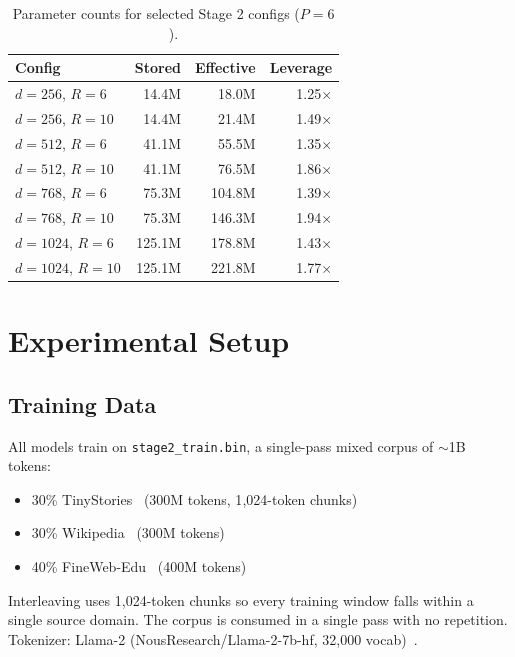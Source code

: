 \documentclass{article}
\begin{document}
\begin{table}[htbp]
\centering
\caption{Parameter counts for selected Stage 2 configs ($P=6$).}
\label{tab:params}
\footnotesize
\begin{tabular}{lrrr}
\toprule
Config & Stored & Effective & Leverage \\
\midrule
$d=256$, $R=6$ & 14.4M & 18.0M & 1.25$\times$ \\
$d=256$, $R=10$ & 14.4M & 21.4M & 1.49$\times$ \\
$d=512$, $R=6$ & 41.1M & 55.5M & 1.35$\times$ \\
$d=512$, $R=10$ & 41.1M & 76.5M & 1.86$\times$ \\
$d=768$, $R=6$ & 75.3M & 104.8M & 1.39$\times$ \\
$d=768$, $R=10$ & 75.3M & 146.3M & 1.94$\times$ \\
$d=1024$, $R=6$ & 125.1M & 178.8M & 1.43$\times$ \\
$d=1024$, $R=10$ & 125.1M & 221.8M & 1.77$\times$ \\
\bottomrule
\end{tabular}
\end{table}

\section{Experimental Setup}
\label{sec:setup}

\subsection{Training Data}

All models train on \texttt{stage2\_train.bin}, a single-pass mixed corpus of $\sim$1B tokens:
\begin{itemize}[leftmargin=*, topsep=2pt, itemsep=1pt]
  \item 30\% TinyStories~\citep{tinystories2023} (300M tokens, 1{,}024-token chunks)
  \item 30\% Wikipedia~\citep{wikidump} (300M tokens)
  \item 40\% FineWeb-Edu~\citep{fineweb2024} (400M tokens)
\end{itemize}

Interleaving uses 1{,}024-token chunks so every training window falls within a single source domain. The corpus is consumed in a single pass with no repetition. Tokenizer: Llama-2 (NousResearch/Llama-2-7b-hf, 32{,}000 vocab)~\citep{touvron2023llama}.
\end{document}
